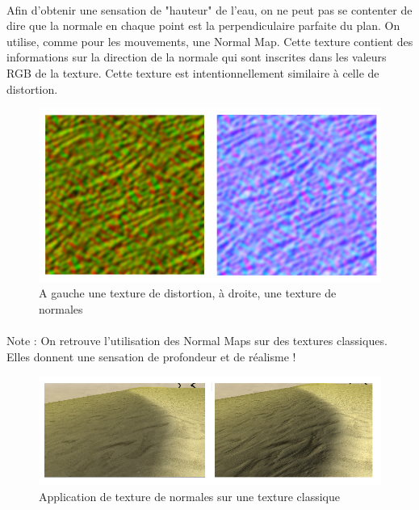 \documentclass{EPUProjetDi}
\begin{document}
\paragraph{}
Afin d'obtenir une sensation de "hauteur" de l'eau, on ne peut pas se contenter de dire que la normale en chaque point est la perpendiculaire parfaite du plan.
On utilise, comme pour les mouvements, une Normal Map. Cette texture contient des informations sur la direction de la normale qui sont inscrites dans les valeurs RGB de la texture.
Cette texture est intentionnellement similaire à celle de distortion.


\begin{figure}[h]
	\centering
	\includegraphics[scale=.4]{water_distortion_normal}
	\caption{A gauche une texture de distortion, à droite, une texture de normales}
	\label{fig:water_distortion_normal}
\end{figure}

\paragraph{}

Note : On retrouve l'utilisation des Normal Maps sur des textures classiques. Elles donnent une sensation de profondeur et de réalisme !

\begin{figure}[h]
	\centering
	\includegraphics[scale=.6]{normals_tex}
	\caption{Application de texture de normales sur une texture classique}
	\label{fig:normals_tex}
\end{figure}
\end{document}
